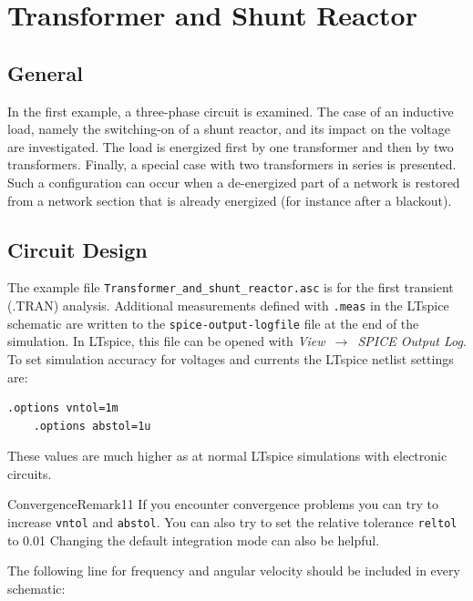\chapter{Transformer and Shunt Reactor}
\label{chap:transformer-shunt-reactor}

\section{General}
\label{sec:tsr-general}

In the first example, a three-phase circuit is examined. The case of an inductive load, namely the switching-on of a shunt reactor, and its impact on the voltage are investigated. The load is energized first by one transformer and then by two transformers. Finally, a special case with two transformers in series is presented. Such a configuration can occur when a de-energized part of a network is restored from a network section that is already energized (for instance after a blackout).


\section{Circuit Design}
\label{sec:tsr-circuit-design}
The example file \texttt{Transformer\_and\_shunt\_reactor.asc} is for the first transient (.TRAN) analysis. 
Additional measurements defined with \texttt{.meas} in the LTspice schematic are written to the \texttt{spice-output-logfile} file at the end of the simulation. In LTspice, this file can be opened with \emph{View~$\rightarrow$~SPICE Output Log}. 
To set simulation accuracy for voltages and currents the LTspice netlist settings are:\\ 

\begin{lstlisting}[style=LTspice]
	.options vntol=1m
	.options abstol=1u
\end{lstlisting}

\noindent These values are much higher as at normal LTspice simulations with electronic circuits.

\begin{remark}{Convergence}{Remark11}
	If you encounter convergence problems you can try to increase \texttt{vntol} and \texttt{abstol}.
	You can also try to set the relative tolerance \texttt{reltol} to 0.01
	Changing the default integration mode can also be helpful.
\end{remark}

\noindent The following line for frequency and angular velocity should be included in every schematic:\\

